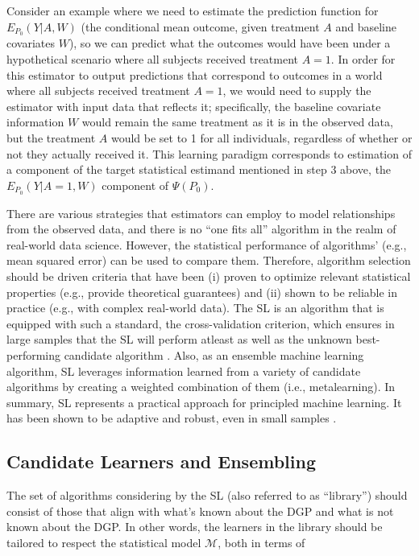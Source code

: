 \documentclass[
  12pt, krantz2,
]{krantz}
\newcommand{\1}{\mathbbm{1}}
\theoremstyle{definition}
\theoremstyle{definition}
\theoremstyle{definition}
\theoremstyle{definition}
\theoremstyle{remark}
\begin{document}
Consider an example where we need to estimate the prediction function for
\(E_{P_0}(Y|A,W)\) (the conditional mean outcome, given treatment \(A\) and
baseline covariates \(W\)), so we can predict what the outcomes would have been
under a hypothetical scenario where all subjects received treatment \(A=1\). In
order for this estimator to output predictions that correspond to outcomes in
a world where all subjects received treatment \(A=1\), we would need to supply
the estimator with input data that reflects it; specifically, the baseline
covariate information \(W\) would remain the same treatment as it is in the
observed data, but the treatment \(A\) would be set to 1 for all individuals,
regardless of whether or not they actually received it. This learning paradigm
corresponds to estimation of a component of the target statistical estimand
mentioned in step 3 above, the \(E_{P_0}(Y|A=1,W)\) component of \(\Psi(P_0)\).

There are various strategies that estimators can employ to model relationships
from the observed data, and there is no ``one fits all'' algorithm in the realm
of real-world data science. However, the statistical performance of algorithms'
(e.g., mean squared error) can be used to compare them. Therefore, algorithm
selection should be driven criteria that have been (i) proven to optimize
relevant statistical properties (e.g., provide theoretical guarantees) and (ii)
shown to be reliable in practice (e.g., with complex real-world data). The SL
is an algorithm that is equipped with such a standard, the cross-validation
criterion, which ensures in large samples that the SL will perform atleast as
well as the unknown best-performing candidate algorithm \citep{vdl2003unified, vaart2006oracle, vdl2007super}. Also, as an ensemble machine learning
algorithm, SL leverages information learned from a variety of candidate
algorithms by creating a weighted combination of
them (i.e., metalearning). In summary, SL represents a practical approach for
principled machine learning. It has been shown to be adaptive and robust, even
in small samples \citep{polley2010super}.

\hypertarget{candidate-learners-and-ensembling}{%
\subsection{Candidate Learners and Ensembling}\label{candidate-learners-and-ensembling}}

The set of algorithms considering by the SL (also referred to as ``library'')
should consist of those that align with what's known about the DGP and what is
not known about the DGP. In other words, the learners in the library should
be tailored to respect the statistical model \(\mathcal{M}\), both in terms of
\end{document}
